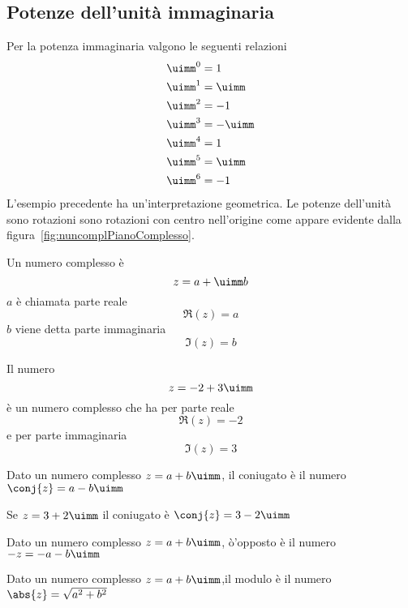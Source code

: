\subsection{Potenze dell'unità immaginaria}
Per la potenza immaginaria valgono le seguenti relazioni
\begin{align*}
	&\uimm^0=1\\
	&\uimm^1=\uimm\\
	&\uimm^2=-1\\
	&\uimm^3=-\uimm\\
	&\uimm^4=1\\
	&\uimm^5=\uimm\\
	&\uimm^6=-1
\end{align*}
L'esempio precedente ha un'interpretazione geometrica. Le potenze dell'unità sono rotazioni  sono rotazioni con  centro nell'origine come appare evidente dalla figura~\vref{fig:nuncomplPianoComplesso}.
\begin{definizione}
	 Un numero complesso è \[z=a+\uimm b\] $a$ è chiamata parte reale \[\Re\left(z\right)=a\]
	$b$ viene detta  parte immaginaria\[\Im\left(z\right)=b \] 
\end{definizione}
\begin{esempio}
Il numero \[z=-2+3\uimm \] è un numero complesso che ha per parte reale \[\Re(z)=-2\]  e per parte immaginaria \[\Im(z)=3\]
\end{esempio}
\begin{definizione}
	Dato un numero complesso $z=a+b\uimm$, il coniugato è  il numero $\conj{z}=a-b\uimm$
\end{definizione}
\begin{esempio}
Se $z=3+2\uimm$ il coniugato è $\conj{z}=3-2\uimm$ 
\end{esempio}
\begin{definizione}
Dato un numero complesso $z=a+b\uimm$, ò'opposto è il numero $-z=-a-b\uimm$
\end{definizione}
\begin{definizione}
Dato un numero  complesso $z=a+b\uimm$,il modulo è il numero $\abs{z}=\sqrt{a^2+b^2}$
\end{definizione}
